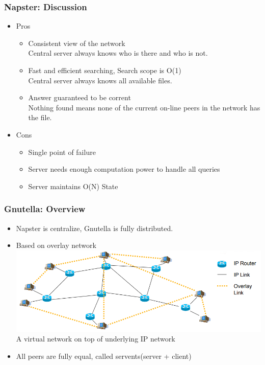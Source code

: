 \begin{frame}
    \frametitle{Napster: Discussion}
    \begin{itemize}
        \item Pros
        \begin{itemize}
            \item Consistent view of the network \\
                Central server always knows who is there and who is not.
            \item Fast and efficient searching, Search scope is O(1) \\
                Central server always knows all available files.
            \item Answer guaranteed to be corrent \\
                Nothing found means none of the current on-line peers in the network has the file.
        \end{itemize}
        \item Cons
        \begin{itemize}
            \item Single point of failure
            \item Server needs enough computation power to handle all queries
            \item Server maintains O(N) State
        \end{itemize}
    \end{itemize}
\end{frame}

\begin{frame}
    \frametitle{Gnutella: Overview}
    \begin{itemize}
        \item Napster is centralize, Gnutella is fully distributed.
        \item Based on overlay network \\
            \includegraphics[scale=0.35]{figures/overlay_network.png} \\
            A virtual network on top of underlying IP network
        \item All peers are fully equal, called servents(server + client)
    \end{itemize}
\end{frame}


